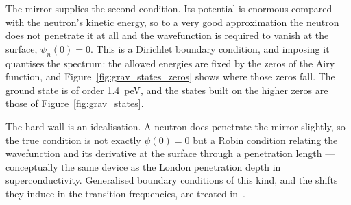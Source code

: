 \documentclass[a4paper,headsepline,oneside,11pt]{scrartcl}
\begin{document}
The mirror supplies the second condition. Its potential is enormous compared
with the neutron's kinetic energy, so to a very good approximation the neutron
does not penetrate it at all and the wavefunction is required to vanish at the
surface, $\psi_n(0) = 0$. This is a Dirichlet boundary condition, and imposing
it quantises the spectrum: the allowed energies are fixed by the zeros of the
Airy function, and Figure~\ref{fig:grav_states_zeros} shows where those zeros
fall. The ground state is of order \SI{1.4}{\pico\electronvolt}, and the states
built on the higher zeros are those of Figure~\ref{fig:grav_states}.

The hard wall is an idealisation. A neutron
does penetrate the mirror slightly, so the true condition is not exactly
$\psi(0) = 0$ but a Robin condition relating the wavefunction and its
derivative at the surface through a penetration length --- conceptually the
same device as the London penetration depth in superconductivity. Generalised
boundary conditions of this kind, and the shifts they induce in the transition
frequencies, are treated in~\cite{Sung2025}.
\end{document}
